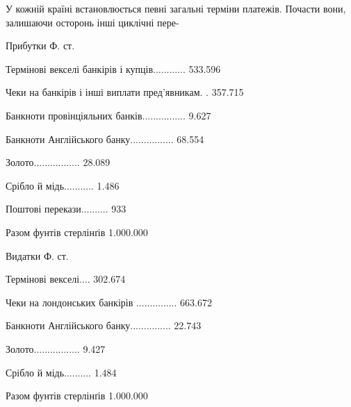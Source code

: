 У кожній країні встановлюється певні загальні терміни платежів.
Почасти вони, залишаючи осторонь інші циклічні пере-

Прибутки    Ф. ст.

Термінові векселі банкірів
і купців............ 533.596

Чеки на банкірів і інші
виплати пред’явникам. . 357.715

Банкноти провінціяльних
банків................ 9.627

Банкноти Англійського
банку................ 68.554

Золото................. 28.089

Срібло й мідь........... 1.486

Поштові перекази.......... 933

Разом фунтів стерлінґів 1.000.000

Видатки    Ф. ст.

Термінові векселі.... 302.674

Чеки на лондонських банкірів
............... 663.672

Банкноти Англійського
банку............... 22.743

Золото................. 9.427

Срібло й мідь.......... 1.484

Разом фунтів стерлінґів 1.000.000

